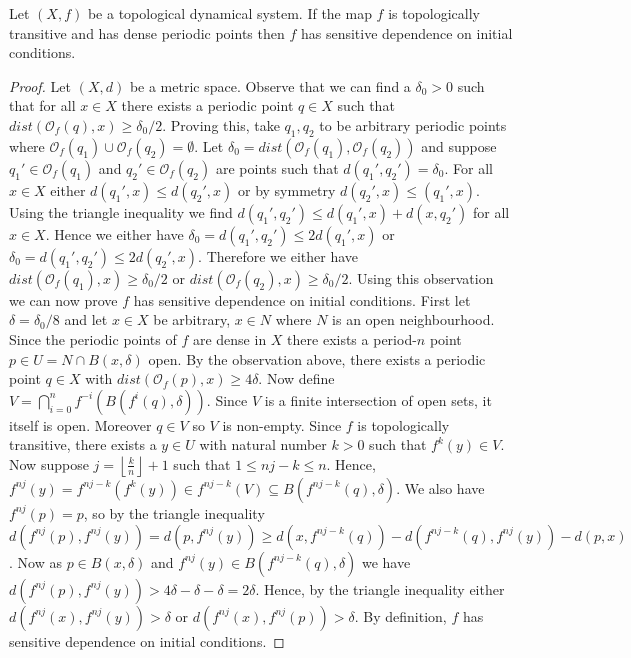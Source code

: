 \begin{prop} \label{prop:transitivity-dense-periodic-implies-sdic}
    Let $(X, f)$ be a topological dynamical system. If the map $f$ is topologically transitive and has dense periodic points then $f$ has sensitive dependence on initial conditions.
    \begin{proof}
        Let $(X, d)$ be a metric space. Observe that we can find a $\delta_0 > 0$ such that for all $x \in X$ there exists a periodic point $q \in X$ such that $dist(\mathcal{O}_f(q), x) \geq \delta_0/2$. Proving this, take $q_1, q_2$ to be arbitrary periodic points where $\mathcal{O}_f(q_1) \cup \mathcal{O}_f(q_2) = \emptyset$. Let $\delta_0 = dist(\mathcal{O}_f(q_1), \mathcal{O}_f(q_2))$ and suppose $q_1' \in \mathcal{O}_f(q_1)$ and  $q_2' \in \mathcal{O}_f(q_2)$ are points such that $d(q_1', q_2') = \delta_0$. For all $x \in X$ either $d(q_1', x) \leq d(q_2', x)$ or by symmetry $d(q_2', x) \leq (q_1', x)$. Using the triangle inequality we find $d(q_1', q_2') \leq d(q_1', x) + d(x, q_2')$ for all $x \in X$. Hence we either have $\delta_0 = d(q_1', q_2') \leq 2d(q_1', x)$ or $\delta_0 = d(q_1', q_2') \leq 2d(q_2', x)$. Therefore we either have $dist(\mathcal{O}_f(q_1), x) \geq \delta_0/2$ or $dist(\mathcal{O}_f(q_2), x) \geq \delta_0/2$. Using this observation we can now prove $f$ has sensitive dependence on initial conditions. First let $\delta = \delta_0/8$ and let $x \in X$ be arbitrary, $x \in N$ where $N$ is an open neighbourhood. Since the periodic points of $f$ are dense in $X$ there exists a period-$n$ point $p \in U = N \cap B(x, \delta)$ open. By the observation above, there exists a periodic point $q \in X$ with $dist(\mathcal{O}_f(p), x) \geq 4\delta$. Now define $V = \bigcap_{i=0}^n f^{-i}(B(f^i(q), \delta))$. Since $V$ is a finite intersection of open sets, it itself is open. Moreover $q \in V$ so $V$ is non-empty. Since $f$ is topologically transitive, there exists a $y \in U$ with natural number $k > 0$ such that $f^k(y) \in V$. Now suppose $j = \left\lfloor \frac{k}{n} \right\rfloor + 1$ such that $1 \leq nj - k \leq n$. Hence, $f^{nj}(y) = f^{nj - k}(f^k(y)) \in f^{nj - k}(V) \subseteq B(f^{nj - k}(q), \delta)$. We also have $f^{nj}(p) = p$, so by the triangle inequality $d(f^{nj}(p), f^{nj}(y)) = d(p, f^{nj}(y)) \geq d(x, f^{nj - k}(q)) - d(f^{nj - k}(q), f^{nj}(y)) - d(p, x)$. Now as $p \in B(x, \delta)$ and $f^{nj}(y) \in B(f^{nj - k}(q), \delta)$ we have $d(f^{nj}(p), f^{nj}(y)) > 4\delta - \delta - \delta = 2\delta$. Hence, by the triangle inequality either $d(f^{nj}(x), f^{nj}(y)) > \delta$ or $d(f^{nj}(x), f^{nj}(p)) > \delta$. By definition, $f$ has sensitive dependence on initial conditions.
    \end{proof}
\end{prop}


